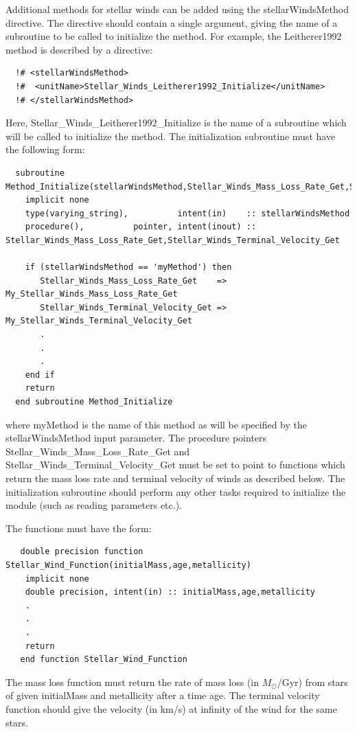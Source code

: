 Additional methods for stellar winds can be added using the {\normalfont \ttfamily stellarWindsMethod} directive. The directive should contain a single argument, giving the name of a subroutine to be called to initialize the method. For example, the {\normalfont \ttfamily Leitherer1992} method is described by a directive:
\begin{verbatim}
  !# <stellarWindsMethod>
  !#  <unitName>Stellar_Winds_Leitherer1992_Initialize</unitName>
  !# </stellarWindsMethod>
\end{verbatim}
Here, {\normalfont \ttfamily Stellar\_Winds\_Leitherer1992\_Initialize} is the name of a subroutine which will be called to initialize the method. The initialization subroutine must have the following form:
\begin{verbatim}
  subroutine Method_Initialize(stellarWindsMethod,Stellar_Winds_Mass_Loss_Rate_Get,Stellar_Winds_Terminal_Velocity_Get)
    implicit none
    type(varying_string),          intent(in)    :: stellarWindsMethod
    procedure(),          pointer, intent(inout) :: Stellar_Winds_Mass_Loss_Rate_Get,Stellar_Winds_Terminal_Velocity_Get
    
    if (stellarWindsMethod == 'myMethod') then
       Stellar_Winds_Mass_Loss_Rate_Get    => My_Stellar_Winds_Mass_Loss_Rate_Get
       Stellar_Winds_Terminal_Velocity_Get => My_Stellar_Winds_Terminal_Velocity_Get
       .
       .
       .
    end if
    return
  end subroutine Method_Initialize
\end{verbatim}
where {\normalfont \ttfamily myMethod} is the name of this method as will be specified by the {\normalfont \ttfamily stellarWindsMethod} input parameter. The procedure pointers {\normalfont \ttfamily Stellar\_Winds\_Mass\_Loss\_Rate\_Get} and {\normalfont \ttfamily Stellar\_Winds\_Terminal\_Velocity\_Get} must be set to point to functions which return the mass loss rate and terminal velocity of winds as described below. The initialization subroutine should perform any other tasks required to initialize the module (such as reading parameters etc.).

The functions must have the form:
\begin{verbatim}
   double precision function Stellar_Wind_Function(initialMass,age,metallicity)
    implicit none
    double precision, intent(in) :: initialMass,age,metallicity
    .
    .
    .
    return
   end function Stellar_Wind_Function 
\end{verbatim}
The mass loss function must return the rate of mass loss (in $M_\odot$/Gyr) from stars of given {\normalfont \ttfamily initialMass} and {\normalfont \ttfamily metallicity} after a time {\normalfont \ttfamily age}. The terminal velocity function should give the velocity (in km/s) at infinity of the wind for the same stars.

